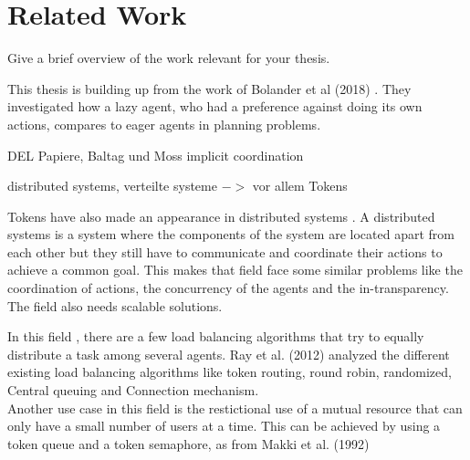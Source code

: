 \chapter{Related Work}\label{chap:relatedwork}
Give a brief overview of the work relevant for your thesis.

This thesis is building up from the work of Bolander et al (2018) \cite{bolander2018better}. They investigated how a lazy agent, who had a preference against doing its own actions, compares to eager agents in planning problems. 

DEL Papiere,
Baltag und Moss
implicit coordination

distributed systems, verteilte systeme $->$ vor allem Tokens

Tokens have also made an appearance in distributed systems . A distributed systems is a system where the components of the system are located apart from each other but they still have to communicate and coordinate their actions to achieve a common goal. This makes that field face some similar problems like the coordination of actions, the concurrency of the agents and the in-transparency. The field also needs scalable solutions.

In this field , there are a few load balancing algorithms that try to equally distribute a task among several agents. Ray et al. (2012) \cite{ray2012execution} analyzed the different existing load balancing algorithms like token routing, round robin, randomized, Central queuing and Connection mechanism. \\
Another use case in this field is the restictional use of a mutual resource that can only have a small number of users at a time. This can be achieved by using a token queue and a token semaphore, as from Makki et al. (1992) \cite{makki1992token}
